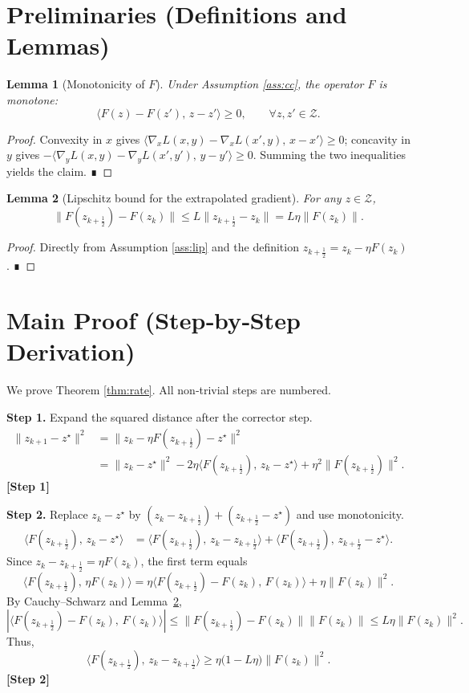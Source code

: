 \documentclass{article}
\newtheorem{lemma}{Lemma}
\begin{document}
\newpage
\section*{Preliminaries (Definitions and Lemmas)}
\begin{lemma}[Monotonicity of $F$]\label{lem:mono}
Under Assumption \ref{ass:cc}, the operator $F$ is monotone:
\[
\langle F(z)-F(z'),\,z-z'\rangle\ge0,\qquad\forall z,z'\in\mathcal{Z}.
\]
\end{lemma}
\begin{proof}
Convexity in $x$ gives $\langle\nabla_x L(x,y)-\nabla_x L(x',y),\,x-x'\rangle\ge0$;
concavity in $y$ gives $-\langle\nabla_y L(x,y)-\nabla_y L(x',y'),\,y-y'\rangle\ge0$.
Summing the two inequalities yields the claim. ∎
\end{proof}
\begin{lemma}[Lipschitz bound for the extrapolated gradient]\label{lem:lip}
For any $z\in\mathcal{Z}$,
\[
\|F(z_{k+\frac12})-F(z_k)\|\le L\|z_{k+\frac12}-z_k\|=L\eta\|F(z_k)\|.
\tag{3}
\]
\end{lemma}
\begin{proof}
Directly from Assumption \ref{ass:lip} and the definition $z_{k+\frac12}=z_k-\eta F(z_k)$. ∎
\end{proof}

\section*{Main Proof (Step‑by‑Step Derivation)}
We prove Theorem \ref{thm:rate}.  
All non‑trivial steps are numbered.

\medskip
\noindent\textbf{Step 1.} Expand the squared distance after the corrector step.
\begin{align}
\|z_{k+1}-z^\star\|^2
&= \bigl\|z_k-\eta F(z_{k+\frac12})-z^\star\bigr\|^2 \nonumber\\
&= \|z_k-z^\star\|^2 -2\eta\langle F(z_{k+\frac12}),\,z_k-z^\star\rangle
   +\eta^2\|F(z_{k+\frac12})\|^2 . \tag{4}
\end{align}
\textbf{[Step 1]}

\medskip
\noindent\textbf{Step 2.} Replace $z_k-z^\star$ by $(z_k-z_{k+\frac12})+(z_{k+\frac12}-z^\star)$ and use monotonicity.
\begin{align}
\langle F(z_{k+\frac12}),\,z_k-z^\star\rangle
&= \langle F(z_{k+\frac12}),\,z_k-z_{k+\frac12}\rangle
   +\langle F(z_{k+\frac12}),\,z_{k+\frac12}-z^\star\rangle . \tag{5}
\end{align}
Since $z_k-z_{k+\frac12}= \eta F(z_k)$, the first term equals
\[
\langle F(z_{k+\frac12}),\,\eta F(z_k)\rangle
= \eta\langle F(z_{k+\frac12})-F(z_k),\,F(z_k)\rangle
   +\eta\|F(z_k)\|^2 . \tag{6}
\]
By Cauchy–Schwarz and Lemma~\ref{lem:lip},
\[
|\langle F(z_{k+\frac12})-F(z_k),\,F(z_k)\rangle|
\le \|F(z_{k+\frac12})-F(z_k)\|\|F(z_k)\|
\le L\eta\|F(z_k)\|^2 . \tag{7}
\]
Thus,
\[
\langle F(z_{k+\frac12}),\,z_k-z_{k+\frac12}\rangle
\ge \eta\bigl(1-L\eta\bigr)\|F(z_k)\|^2 . \tag{8}
\]
\textbf{[Step 2]}
\end{document}
